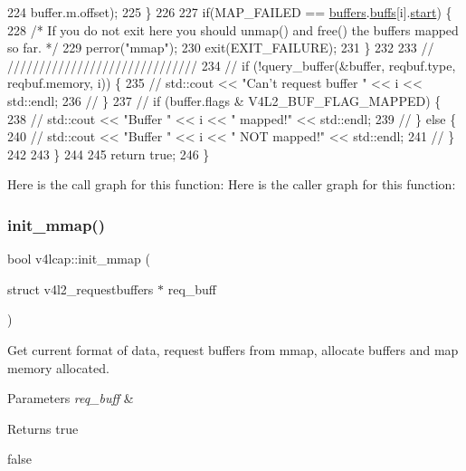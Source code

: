 \begin{DoxyCode}
224                     buffer.m.offset);
225         \}
226 
227         \textcolor{keywordflow}{if}(MAP\_FAILED == \hyperlink{classv4lcap_a046084072d2279bb204ed93cd2692700}{buffers}.\hyperlink{structv4lcap_1_1buffer__holder_afa53426fad11e19f7d615f564c979495}{buffs}[i].\hyperlink{structv4lcap_1_1buffer_ae4fca9eb7724f4a93ee14537fb34597e}{start}) \{
228             \textcolor{comment}{/* If you do not exit here you should unmap() and free() the buffers mapped so far. */}
229             perror(\textcolor{stringliteral}{"mmap"});
230             exit(EXIT\_FAILURE);
231         \}
232 
233 \textcolor{comment}{//          //////////////////////////////}
234 \textcolor{comment}{//          if (!query\_buffer(&buffer, reqbuf.type, reqbuf.memory, i)) \{}
235 \textcolor{comment}{//              std::cout << "Can't request buffer " << i << std::endl;}
236 \textcolor{comment}{//          \}}
237 \textcolor{comment}{//          if (buffer.flags & V4L2\_BUF\_FLAG\_MAPPED) \{}
238 \textcolor{comment}{//              std::cout << "Buffer " << i << " mapped!" << std::endl;}
239 \textcolor{comment}{//          \} else \{}
240 \textcolor{comment}{//              std::cout << "Buffer " << i << " NOT mapped!" << std::endl;}
241 \textcolor{comment}{//          \}}
242 
243     \}
244 
245     \textcolor{keywordflow}{return} \textcolor{keyword}{true};
246 \}
\end{DoxyCode}
Here is the call graph for this function\+:
Here is the caller graph for this function\+:
\mbox{\label{classv4lcap_adc14ff929732ccd31b790bc118cfd06a}} 
\subsubsection{\texorpdfstring{init\+\_\+mmap()}{init\_mmap()}\hspace{0.1cm}{\footnotesize\ttfamily [2/2]}}
{\footnotesize\ttfamily bool v4lcap\+::init\+\_\+mmap (\begin{DoxyParamCaption}\item[{struct v4l2\+\_\+requestbuffers $\ast$}]{req\+\_\+buff }\end{DoxyParamCaption})}



Get current format of data, request buffers from mmap, allocate buffers and map memory allocated. 


\begin{DoxyParams}{Parameters}
{\em req\+\_\+buff} & \\
\hline
\end{DoxyParams}
\begin{DoxyReturn}{Returns}
true 

false 
\end{DoxyReturn}
\mbox{\label{classv4lcap_a0feac915e89a04f087bce5310f8b1051}} 
